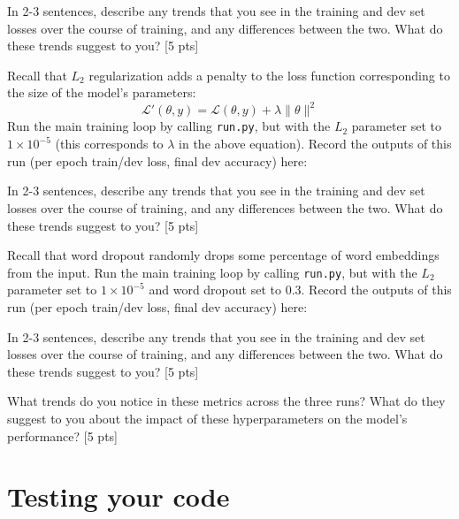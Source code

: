 \documentclass[11pt]{article}
\begin{document}
\vspace{4em}

\noindent In 2-3 sentences, describe any trends that you see in the training and dev set losses over the course of training, and any differences between the two.  What do these trends suggest to you? \hfill [5 pts]


\vspace{2em}
 Recall that $L_2$ regularization adds a penalty to the loss function corresponding to the size of the model's parameters:
\[ \mathcal{L}'(\theta, y) = \mathcal{L}(\theta, y) + \lambda \|\theta\|^2 \]
Run the main training loop by calling \texttt{run.py}, but with the $L_2$ parameter set to $1\times10^{-5}$ (this corresponds to $\lambda$ in the above equation).  Record the outputs of this run (per epoch train/dev loss, final dev accuracy) here:

\vspace{4em}

\noindent In 2-3 sentences, describe any trends that you see in the training and dev set losses over the course of training, and any differences between the two.  What do these trends suggest to you? \hfill [5 pts]


\vspace{2em}
 Recall that word dropout randomly drops some percentage of word embeddings from the input.
Run the main training loop by calling \texttt{run.py}, but with the $L_2$ parameter set to $1\times10^{-5}$ and word dropout set to $0.3$.  Record the outputs of this run (per epoch train/dev loss, final dev accuracy) here:

\vspace{4em}

\noindent In 2-3 sentences, describe any trends that you see in the training and dev set losses over the course of training, and any differences between the two.  What do these trends suggest to you? \hfill [5 pts]


\vspace{2em}
 What trends do you notice in these metrics across the three runs?  What do they suggest to you about the impact of these hyperparameters on the model's performance? \hfill [5 pts]



\section{Testing your code}
\end{document}
